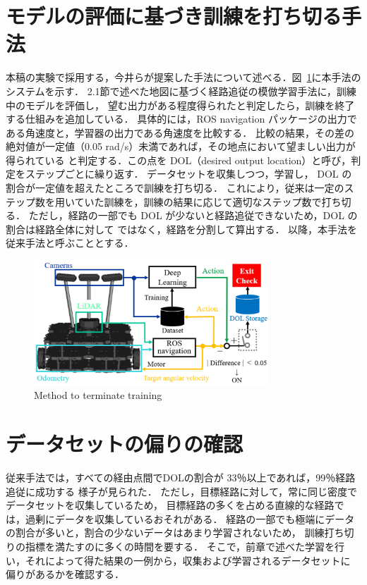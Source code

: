 \documentclass{jarticle}
\renewcommand{\figurename}{図~}
\newcommand{\figref}[1]{\figurename\ref{#1}}
\begin{document}
\section{モデルの評価に基づき訓練を打ち切る手法}
本稿の実験で採用する，今井らが提案した手法について述べる．\figref{fig:5}に本手法のシステムを示す．
2.1節で述べた地図に基づく経路追従の模倣学習手法に，訓練中のモデルを評価し，
望む出力がある程度得られたと判定したら，訓練を終了する仕組みを追加している．
具体的には，ROS navigation パッケージの出力である角速度と，学習器の出力である角速度を比較する．
比較の結果，その差の絶対値が一定値（0.05 rad/s）未満であれば，その地点において望ましい出力が得られている
と判定する．この点を DOL（desired output location）と呼び，判定をステップごとに繰り返す．
データセットを収集しつつ，学習し， DOL の割合が一定値を超えたところで訓練を打ち切る．
これにより，従来は一定のステップ数を用いていた訓練を，訓練の結果に応じて適切なステップ数で打ち切る．
ただし，経路の一部でも DOL が少ないと経路追従できないため，DOL の割合は経路全体に対して
ではなく，経路を分割して算出する．
以降，本手法を従来手法と呼ぶこととする．

\begin{figure}[h!]
  \centering
   \includegraphics[height=47mm]{./pdf/moderu.pdf}
   \caption{Method to terminate training}
   \label{fig:5}
\end{figure}



\section{データセットの偏りの確認}
従来手法では，すべての経由点間でDOLの割合が 33％以上であれば，99％経路追従に成功する
様子が見られた\cite{imai2}．
ただし，目標経路に対して，常に同じ密度でデータセットを収集しているため，
目標経路の多くを占める直線的な経路では，過剰にデータを収集しているおそれがある．
経路の一部でも極端にデータの割合が多いと，割合の少ないデータはあまり学習されないため，
訓練打ち切りの指標を満たすのに多くの時間を要する．
そこで，前章で述べた学習を行い，それによって得た結果の一例から，収集および学習されるデータセットに
偏りがあるかを確認する．
\end{document}
